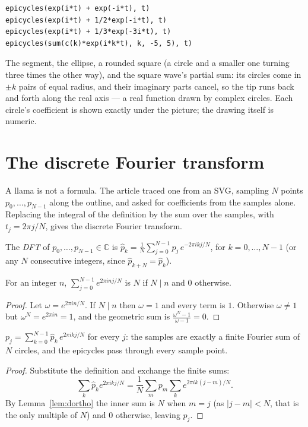 \begin{trybox}
\begin{verbatim}
epicycles(exp(i*t) + exp(-i*t), t)
epicycles(exp(i*t) + 1/2*exp(-i*t), t)
epicycles(exp(i*t) + 1/3*exp(-3i*t), t)
epicycles(sum(c(k)*exp(i*k*t), k, -5, 5), t)
\end{verbatim}
  The segment, the ellipse, a rounded square (a circle and a smaller one turning three times the
  other way), and the square wave's partial sum: its circles come in $\pm k$ pairs of equal radius,
  and their imaginary parts cancel, so the tip runs back and forth along the real axis --- a real
  function drawn by complex circles. Each circle's coefficient is shown exactly under the picture;
  the drawing itself is numeric.
\end{trybox}

\section{The discrete Fourier transform}

A llama is not a formula. The article traced one from an SVG, sampling $N$ points $p_0, \dots,
p_{N-1}$ along the outline, and asked for coefficients from the samples alone. Replacing the
integral of the definition by the sum over the samples, with $t_j = 2\pi j/N$, gives the discrete
Fourier transform.

\begin{definition}
  The \emph{DFT} of $p_0, \dots, p_{N-1} \in \mathbb{C}$ is $\hat p_k = \frac{1}{N}\sum_{j=0}^{N-1}
  p_j\,e^{-2\pi i kj/N}$, for $k = 0, \dots, N - 1$ (or any $N$ consecutive integers, since
  $\hat p_{k+N} = \hat p_k$).
\end{definition}

\begin{lemma}\label{lem:dortho}
  For an integer $n$, $\sum_{j=0}^{N-1} e^{2\pi i nj/N}$ is $N$ if $N \mid n$ and $0$ otherwise.
\end{lemma}
\begin{proof}
  Let $\omega = e^{2\pi i n/N}$. If $N \mid n$ then $\omega = 1$ and every term is $1$. Otherwise
  $\omega \neq 1$ but $\omega^N = e^{2\pi i n} = 1$, and the geometric sum is $\frac{\omega^N -
  1}{\omega - 1} = 0$.
\end{proof}

\begin{theorem}[Inversion]
  $p_j = \sum_{k=0}^{N-1} \hat p_k\,e^{2\pi i kj/N}$ for every $j$: the samples are exactly a finite
  Fourier sum of $N$ circles, and the epicycles pass through every sample point.
\end{theorem}
\begin{proof}
  Substitute the definition and exchange the finite sums:
  \[
    \sum_k \hat p_k e^{2\pi i kj/N} = \frac{1}{N}\sum_m p_m \sum_k e^{2\pi i k(j-m)/N}.
  \]
  By Lemma~\ref{lem:dortho} the inner sum is $N$ when $m = j$ (as $|j - m| < N$, that is the only
  multiple of $N$) and $0$ otherwise, leaving $p_j$.
\end{proof}

